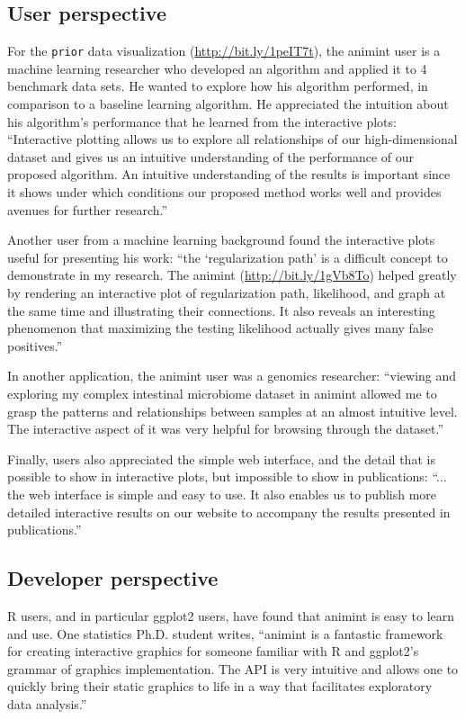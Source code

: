 \documentclass[12pt]{article}\usepackage[]{graphicx}\usepackage[]{color}
\begin{document}
\subsection{User perspective}

For the \texttt{prior} data visualization
(\url{http://bit.ly/1peIT7t}), the animint user is a machine learning
researcher who developed an algorithm and applied it to 4 benchmark
data sets. He wanted to explore how his algorithm performed, in
comparison to a baseline learning algorithm. He appreciated the
intuition about his algorithm's performance that he learned from the
interactive plots: ``Interactive plotting allows us to explore all
relationships of our high-dimensional dataset and gives us an
intuitive understanding of the performance of our proposed
algorithm. An intuitive understanding of the results is important
since it shows under which conditions our proposed method works well
and provides avenues for further research.''

Another user from a machine learning background found the interactive
plots useful for presenting his work: ``the `regularization path' is a
difficult concept to demonstrate in my research. The animint
(\url{http://bit.ly/1gVb8To}) helped greatly by rendering an
interactive plot of regularization path, likelihood, and graph at the
same time and illustrating their connections. It also reveals an
interesting phenomenon that maximizing the testing likelihood actually
gives many false positives.''

In another application, the animint user was a genomics researcher:
``viewing and exploring my complex intestinal microbiome dataset in
animint allowed me to grasp the patterns and relationships between
samples at an almost intuitive level. The interactive aspect of it was
very helpful for browsing through the dataset.''

Finally, users also appreciated the simple web interface, and the
detail that is possible to show in interactive plots, but impossible
to show in publications: ``...  the web interface is simple and easy
to use.  It also enables us to publish more detailed interactive
results on our website to accompany the results presented in
publications.''

\subsection{Developer perspective}

R users, and in particular ggplot2 users, have found that animint 
is easy to learn and use. One statistics Ph.D. student writes, 
``animint is a fantastic framework for creating
interactive graphics for someone familiar with R and ggplot2's grammar
of graphics implementation. The API is very intuitive and allows one
to quickly bring their static graphics to life in a way that
facilitates exploratory data analysis.''
\end{document}
